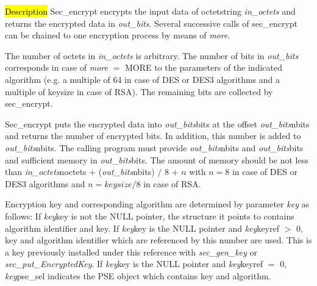 
\hl{Description}
Sec\_encrypt encrypts the input data of octetstring {\em in\_octets} and returns the encrypted data
in {\em out\_bits}. Several successive calls of sec\_encrypt can be chained
to one encryption process by means of {\em more}.
          
The number of octets in {\em in\_octets} is arbitrary. The number of bits in {\em out\_bits}
corresponds in case of {\em more} $=$ MORE to the parameters of the indicated algorithm
(e.g. a multiple of 64 in case of DES or DES3 algorithms and a multiple of keysize
in case of RSA). The remaining bits are collected by sec\_encrypt.

Sec\_encrypt puts the encrypted data into {\em out\_bits}\pf bits at the offset
{\em out\_bits}\pf nbits and returns the number of encrypted bits. In addition, this number is added 
to {\em out\_bits}\pf nbits.
The calling program must provide {\em out\_bits}\pf nbits and {\em out\_bits}\pf bits and sufficient
memory in {\em out\_bits}\pf bits. 
The amount of memory should be not less than
{\em in\_octets}\pf noctets $+$ ({\em out\_bits}\pf nbits) $/$ 8 $+$ $n$ with $n = 8$ 
in case of DES or DES3 algorithms and $n = keysize / 8$ in case of RSA.

Encryption key and corresponding algorithm are determined by parameter {\em key} as follows:
\be
\m If {\em key}\pf key is not the NULL pointer, the structure it points to
   contains algorithm identifier and key.
\m If {\em key}\pf key is the NULL pointer and {\em key}\pf keyref $>$ 0,
   key and algorithm identifier which are referenced by this number are used. This is a key
   previously installed under this reference with {\em sec\_gen\_key} or 
   {\em sec\_put\_EncryptedKey}.
\m If {\em key}\pf key is the NULL pointer and {\em key}\pf keyref $=$ 0,
   {\em key}\pf pse\_sel indicates the PSE object which contains key and algorithm.
\ee

